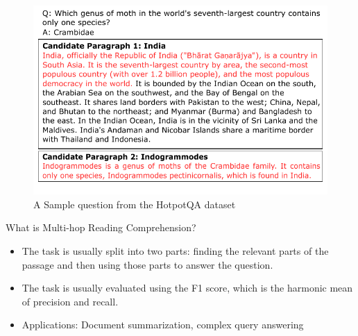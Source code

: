 \documentclass[10pt]{beamer}
\begin{document}
\begin{frame}
  \begin{figure}[t] %
    \centering
    \includegraphics[width=\linewidth]{fig/fig_1_hotpot_example.pdf} %
    \caption{A Sample question from the HotpotQA dataset}
    \label{fig:sample_hotpotqa} %
  \end{figure}
\end{frame}

\begin{frame}[fragile]{What is Multi-hop Reading Comprehension?}

  \begin{itemize}
    \item The task is usually split into two parts: finding the relevant parts of the passage and then using those parts to answer the question.
    \item The task is usually evaluated using the F1 score, which is the harmonic mean of precision and recall.
    \item Applications: Document summarization, complex query answering
    
  \end{itemize}
\end{frame}



\end{document}
